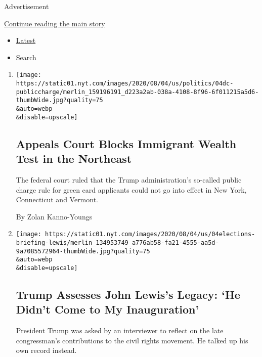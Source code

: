 Advertisement

\protect\hyperlink{after-mid1}{Continue reading the main story}

\begin{itemize}
\tightlist
\item
  \protect\hyperlink{stream-panel}{Latest}
\item
  Search
\end{itemize}

\begin{enumerate}
\def\labelenumi{\arabic{enumi}.}
\item
  \href{/2020/08/04/us/politics/trump-immigration-wealth-test.html}{}

  \texttt{[image: https://static01.nyt.com/images/2020/08/04/us/politics/04dc-publiccharge/merlin\_159196191\_d223a2ab-038a-4108-8f96-6f011215a5d6-thumbWide.jpg?quality=75\\\&auto=webp\\\&disable=upscale]}

  \hypertarget{appeals-court-blocks-immigrant-wealth-test-in-the-northeast}{%
  \subsection{Appeals Court Blocks Immigrant Wealth Test in the
  Northeast}\label{appeals-court-blocks-immigrant-wealth-test-in-the-northeast}}

  The federal court ruled that the Trump administration's so-called
  public charge rule for green card applicants could not go into effect
  in New York, Connecticut and Vermont.

  By Zolan Kanno-Youngs
\item
  \href{/2020/08/04/us/politics/trump-john-lewis-axios.html}{}

  \texttt{[image: https://static01.nyt.com/images/2020/08/04/us/04elections-briefing-lewis/merlin\_134953749\_a776ab58-fa21-4555-aa5d-9a7085572964-thumbWide.jpg?quality=75\\\&auto=webp\\\&disable=upscale]}

  \hypertarget{trump-assesses-john-lewiss-legacy-he-didnt-come-to-my-inauguration-1}{%
  \subsection{Trump Assesses John Lewis's Legacy: `He Didn't Come to My
  Inauguration'}\label{trump-assesses-john-lewiss-legacy-he-didnt-come-to-my-inauguration-1}}

  President Trump was asked by an interviewer to reflect on the late
  congressman's contributions to the civil rights movement. He talked up
  his own record instead.


\end{enumerate}

